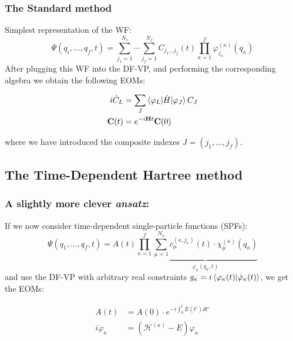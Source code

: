 \documentclass{beamer}
\begin{document}
\begin{frame}
  \frametitle{The Standard method}
  Simplest representation of the WF\@: 
\begin{equation}
	\Psi(q_i,\ldots, q_f, t) = \sum_{j_1=1}^{N_1}\cdots\sum_{j_f=1}^{N_f} C_{j_1\ldots j_f}(t)\prod_{\kappa=1}^f\varphi^{(\kappa)}_{j_{\kappa}}(q_{\kappa})
	\label{stme}
\end{equation}
After plugging this WF into the DF-VP, and performing the corresponding algebra we obtain
the following EOMs:
\begin{block}{}
\begin{align}
\begin{split}
	i\dot{C}_L &= \sum_J \braket{\varphi_L|\hat{H}|\varphi_J}C_J \\
	\mathbf{C}(t) &= e^{-i\mathbf{H}t}\mathbf{C}(0)
\end{split}
\end{align}
\end{block}
where we have introduced the composite indexes \(J = (j_1,\ldots,j_f)\).

\end{frame}

\subsection{The Time-Dependent Hartree method}\label{tdh}

\begin{frame}
  \frametitle{A slightly more clever \emph{ansatz}:}
  \justifying{}
  If we now consider time-dependent single-particle functions (SPFs):
\begin{equation}
  \Psi(q_1,\ldots, q_f, t) = A(t)\prod^f_{\kappa=1}\underbrace{
	\sum_{\mu=1}^{N_{\kappa}}c_{\mu}^{(\kappa, j_{\kappa})}(t)\cdot \chi^{(\kappa)}_{\mu}(q_{\kappa})}_{\varphi_{\kappa}(q_{\kappa}, t)}
\end{equation}
and use the DF-VP with arbitrary real constraints \(g_{\kappa} = i\braket{\varphi_{\kappa}(t)|\dot{\varphi}_{\kappa}(t)}\), we get the EOMs:

\begin{block}{}
  \begin{equation}
    \begin{split}
      A(t) &= A(0) \cdot e^{-i\int_0^t E(t')dt'} \\
      i\dot{\varphi}_{\kappa} &= (\mathcal{H}^{(\kappa)} - E)\varphi_{\kappa}
    \end{split}
  \end{equation}
\end{block}
\end{frame}
\end{document}
